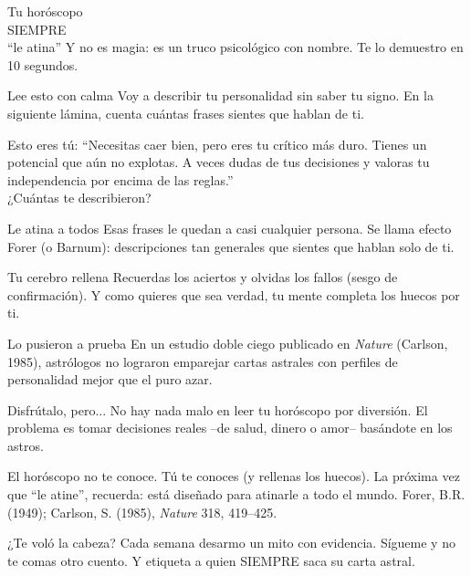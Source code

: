 \documentclass[10pt]{beamer}
\begin{document}
  {Tu horóscopo\\ SIEMPRE\\ ``le atina''}
  {Y no es magia: es un truco psicológico con nombre.
   Te lo demuestro en 10 segundos.}

  {Lee esto con calma}
  {Voy a describir tu personalidad sin saber tu signo. En la siguiente
   lámina, cuenta cuántas frases sientes que hablan de ti.}

  {Esto eres tú:}
  {``Necesitas caer bien, pero eres tu crítico más duro. Tienes un
   potencial que aún no explotas. A veces dudas de tus decisiones y
   valoras tu independencia por encima de las reglas.'' \\[4pt]
   \textcolor{rdcamber}{¿Cuántas te describieron?}}

  {Le atina a todos}
  {Esas frases le quedan a casi cualquier persona. Se llama efecto
   Forer (o Barnum): descripciones tan generales que sientes que hablan
   solo de ti.}

  {Tu cerebro rellena}
  {Recuerdas los aciertos y olvidas los fallos (sesgo de confirmación).
   Y como quieres que sea verdad, tu mente completa los huecos por ti.}

  {Lo pusieron a prueba}
  {En un estudio doble ciego publicado en \emph{Nature} (Carlson, 1985),
   astrólogos no lograron emparejar cartas astrales con perfiles de
   personalidad mejor que el puro azar.}

  {Disfrútalo, pero...}
  {No hay nada malo en leer tu horóscopo por diversión. El problema es
   tomar decisiones reales --de salud, dinero o amor-- basándote en los
   astros.}

  {El horóscopo no te conoce. Tú te conoces (y rellenas los huecos).}
  {La próxima vez que ``le atine'', recuerda: está diseñado para
   atinarle a todo el mundo.}
  {Forer, B.R. (1949); Carlson, S. (1985), \emph{Nature} 318, 419--425.}

  {¿Te voló la cabeza?}
  {Cada semana desarmo un mito con evidencia. Sígueme y no te comas
   otro cuento.}
  {Y etiqueta a quien SIEMPRE saca su carta astral.}
\end{document}

